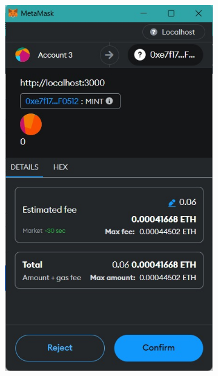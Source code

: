 \begin{itemize}
       \begin{figure} [H] \centering
      \centering
      \begin{subfigure}{0.45\textwidth}
          \includegraphics[scale=0.32]{gambar/confirm_create.jpg}
          \caption{}
          \label{fig:payipfs-a}
      \end{subfigure}
      \hspace{5pt}
      \begin{subfigure}{0.45\textwidth}

\end{subfigure}
\end{figure}
\end{itemize}
